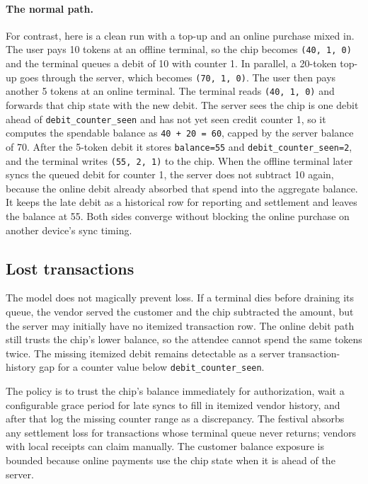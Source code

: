 \paragraph{The normal path.} For contrast, here is a clean run with a top-up and an online purchase mixed in. The user pays 10 tokens at an offline terminal, so the chip becomes \texttt{(40, 1, 0)} and the terminal queues a debit of 10 with counter 1. In parallel, a 20-token top-up goes through the server, which becomes \texttt{(70, 1, 0)}. The user then pays another 5 tokens at an online terminal. The terminal reads \texttt{(40, 1, 0)} and forwards that chip state with the new debit. The server sees the chip is one debit ahead of \texttt{debit\_counter\_seen} and has not yet seen credit counter 1, so it computes the spendable balance as \texttt{40 + 20 = 60}, capped by the server balance of 70. After the 5-token debit it stores \texttt{balance=55} and \texttt{debit\_counter\_seen=2}, and the terminal writes \texttt{(55, 2, 1)} to the chip. When the offline terminal later syncs the queued debit for counter 1, the server does not subtract 10 again, because the online debit already absorbed that spend into the aggregate balance. It keeps the late debit as a historical row for reporting and settlement and leaves the balance at 55. Both sides converge without blocking the online purchase on another device's sync timing.

\subsection{Lost transactions}
\label{subsec:reconciliation-lost}

The model does not magically prevent loss. If a terminal dies before draining its queue, the vendor served the customer and the chip subtracted the amount, but the server may initially have no itemized transaction row. The online debit path still trusts the chip's lower balance, so the attendee cannot spend the same tokens twice. The missing itemized debit remains detectable as a server transaction-history gap for a counter value below \texttt{debit\_counter\_seen}.

The policy is to trust the chip's balance immediately for authorization, wait a configurable grace period for late syncs to fill in itemized vendor history, and after that log the missing counter range as a discrepancy. The festival absorbs any settlement loss for transactions whose terminal queue never returns; vendors with local receipts can claim manually. The customer balance exposure is bounded because online payments use the chip state when it is ahead of the server.

